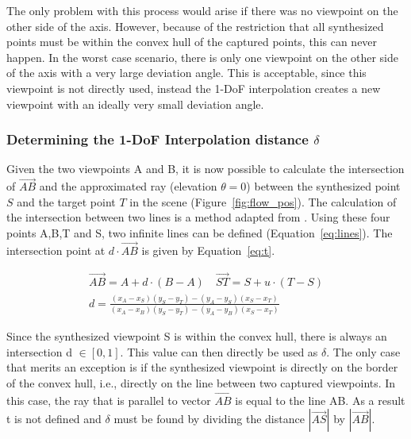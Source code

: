 The only problem with this process would arise if there was no viewpoint on the other side of the axis. However, because of the restriction that all synthesized points must be within the convex hull of the captured points, this can never happen. In the worst case scenario, there is only one viewpoint on the other side of the axis with a very large deviation angle. This is acceptable, since this viewpoint is not directly used, instead the 1-DoF interpolation creates a new viewpoint with an ideally very small deviation angle.

\subsubsection{Determining the 1-DoF Interpolation distance $\delta$}
Given the two viewpoints A and B, it is now possible to calculate the intersection of $\overrightarrow{AB}$ and the approximated ray (elevation $\theta = 0$) between the synthesized point $S$ and the target point $T$ in the scene (Figure~\ref{fig:flow_pos}). The calculation of the intersection between two lines is a method adapted from \cite{lineline}. Using these four points A,B,T and S, two infinite lines can be defined (Equation~\ref{eq:lines}). The intersection point at $d \cdot \overrightarrow{AB}$ is given by Equation~\ref{eq:t}.

\begin{align}
  \overrightarrow{AB} = A + d \cdot (B-A) \quad \overrightarrow{ST} = S + u \cdot (T-S) \label{eq:lines} \\
  d = \frac{(x_A - x_S)(y_S - y_T) - (y_A - y_S)(x_S - x_T)}{(x_A - x_B)(y_S - y_T) - (y_A - y_B)(x_S - x_T)} \label{eq:t}
\end{align}

\noindent
Since the synthesized viewpoint S is within the convex hull, there is always an intersection d $\in [0,1]$. This value can then directly be used as $\delta$. The only case that merits an exception is if the synthesized viewpoint is directly on the border of the convex hull, i.e., directly on the line between two captured viewpoints. In this case, the ray that is parallel to vector $\overrightarrow{AB}$ is equal to the line AB. As a result t is not defined and $\delta$ must be found by dividing the distance $|\overrightarrow{AS}|$ by $|\overrightarrow{AB}|$.

